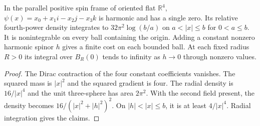 \begin{proposition}
\label{prop:flat-spin-relative-zero}
\leanok
In the parallel positive spin frame of oriented flat $\mathbb R^4$,
$\psi(x)=x_0+x_1 i-x_2 j-x_3 k$ is harmonic and has a single zero.
Its relative fourth-power density integrates to
$32\pi^2\log(b/a)$ on $a<|x|\le b$ for $0<a\le b$.
It is nonintegrable on every ball containing the origin. Adding a
constant nonzero harmonic spinor $h$ gives a finite cost on each
bounded ball. At each fixed radius $R>0$ its integral over $B_R(0)$
tends to infinity as $h\to0$ through nonzero values.
\end{proposition}
\begin{proof}
\leanok
The Dirac contraction of the four constant coefficients vanishes.
The squared mass is $|x|^2$ and the squared gradient is four.
The radial density is $16/|x|^4$ and the unit three-sphere has
area $2\pi^2$. With the second field present, the density becomes
$16/(|x|^2+|h|^2)^2$. On $|h|<|x|\le b$, it is at least $4/|x|^4$.
Radial integration gives the claims.
\end{proof}

